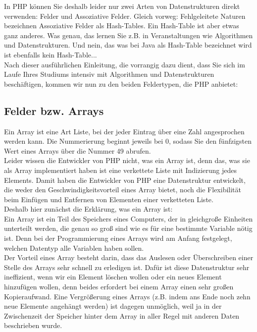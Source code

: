 In PHP können Sie deshalb leider nur zwei Arten von Datenstrukturen direkt verwenden: Felder und Assoziative Felder. Gleich vorweg: Fehlgeleitete Naturen bezeichnen Assoziative Felder als Hash-Tables. Ein Hash-Table ist aber etwas ganz anderes. Was genau, das lernen Sie z.B. in Veranstaltungen wie Algorithmen und Datenstrukturen. Und nein, das was bei Java als Hash-Table bezeichnet wird ist ebenfalls kein Hash-Table...\\

Nach dieser ausführlichen Einleitung, die vorrangig dazu dient, dass Sie sich im Laufe Ihres Studiums intensiv mit Algorithmen und Datenstrukturen beschäftigen, kommen wir nun zu den beiden Feldertypen, die PHP anbietet:

\subsection{Felder bzw. Arrays}

Ein Array ist eine Art Liste, bei der jeder Eintrag über eine Zahl angesprochen werden kann. Die Nummerierung beginnt jeweils bei 0, sodass Sie den fünfzigsten Wert eines Arrays über die Nummer 49 abrufen.\\

Leider wissen die Entwickler von PHP nicht, was ein Array ist, denn das, was sie als Array implementiert haben ist eine verkettete Liste mit Indizierung jedes Elements. Damit haben die Entwickler von PHP eine Datenstruktur entwickelt, die weder den Geschwindigkeitsvorteil eines Array bietet, noch die Flexibilität beim Einfügen und Entfernen von Elementen einer verketteten Liste.\\

Deshalb hier zunächst die Erklärung, was ein Array ist:\\

Ein Array ist ein Teil des Speichers eines Computers, der in gleichgroße Einheiten unterteilt werden, die genau so groß sind wie es für eine bestimmte Variable nötig ist. Denn bei der Programmierung eines Arrays wird am Anfang festgelegt, welchen Datentyp alle Variablen haben sollen. \\

Der Vorteil eines Array besteht darin, dass das Auslesen oder Überschreiben einer Stelle des Arrays sehr schnell zu erledigen ist. Dafür ist diese Datenstruktur sehr ineffizient, wenn wir ein Element löschen wollen oder ein neues Element hinzufügen wollen, denn beides erfordert bei einem Array einen sehr großen Kopieraufwand. Eine Vergrößerung eines Arrays (z.B. indem ans Ende noch zehn neue Elemente angehängt werden) ist dagegen unmöglich, weil ja in der Zwischenzeit der Speicher \glqq{}hinter\grqq{} dem Array in aller Regel mit anderen Daten beschrieben wurde. \\

